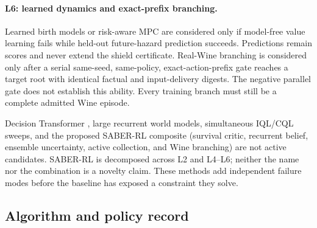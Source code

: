 \documentclass[11pt]{article}
\begin{document}
\paragraph{L6: learned dynamics and exact-prefix branching.}
Learned birth models or risk-aware MPC are considered only if model-free value
learning fails while held-out future-hazard prediction succeeds.  Predictions
remain scores and never extend the shield certificate.  Real-Wine branching is
considered only after a serial same-seed, same-policy, exact-action-prefix gate
reaches a target root with identical factual and input-delivery digests.  The
negative parallel gate does not establish this ability.  Every training branch
must still be a complete admitted Wine episode.

Decision Transformer \citep{chen2021decisiontransformer}, large recurrent
world models, simultaneous IQL/CQL sweeps, and the proposed SABER-RL composite
(survival critic, recurrent belief, ensemble uncertainty, active collection,
and Wine branching) are not active candidates.  SABER-RL is decomposed across
L2 and L4--L6; neither the name nor the combination is a novelty claim.  These
methods add independent failure modes before the baseline has exposed a
constraint they solve.

\subsection{Algorithm and policy record}
\end{document}
